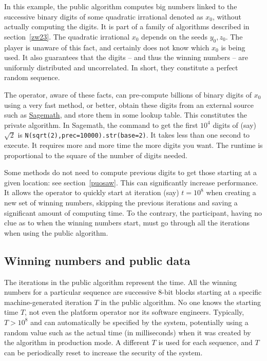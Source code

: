 \documentclass[oneside,10pt]{book}
\begin{document}
In this example, the public algorithm computes big numbers linked to the successive binary digits of some quadratic irrational denoted as $x_0$,
 without actually computing the digits. It is part of a family of algorithms described in section~\ref{zw23}.
The quadratic irrational $x_0$ depends on the seeds $y_0, z_0$.
The player is unaware of this fact, and certainly does not know which $x_0$ is being used. It also guarantees that the digits -- and thus the winning numbers -- are uniformly distributed and uncorrelated. In short, they constitute a perfect random sequence.

The operator, aware of these facts, can pre-compute billions of binary digits of $x_0$ using a very fast method, or better,
 obtain these digits from an external source such as \href{https://sagecell.sagemath.org/}{Sagemath}, and store them in some lookup table. This constitutes the private algorithm.
In Sagemath, the command to get the first $10^4$ digits of (say) $\sqrt{2}$ is
\texttt{N(sqrt(2),prec=10000).str(base=2)}. It takes less than one second to execute. It requires more and more time the more digits you want. The
 runtime is proportional to the square of the number of digits needed.

Some methods do not need to compute previous digits to get those starting at a given location: see section~\ref{puosaw}. This can significantly increase performance. It allows the operator to quickly start at iteration (say) $t=10^8$ when creating a new set of winning numbers, skipping the previous iterations and saving a significant amount of computing time. To the contrary, the participant, having no clue as to when the winning numbers start, must go through all the iterations when using the public algorithm.



\subsection{Winning numbers and public data}\label{bvp0z1}

The iterations in the public algorithm  represent the time.
All the winning numbers for a particular sequence are successive 8-bit blocks starting at a specific machine-generated iteration $T$ in the public algorithm.
No one knows the starting time $T$, not even the platform operator nor its software engineers. Typically, $T > 10^8$ and can automatically be specified
 by the system,  potentially using a random value such as the actual time (in milliseconds) when it was created by the algorithm in production mode. A different $T$ is used for each sequence, and $T$ can be periodically reset to increase the security of the system.
\end{document}
